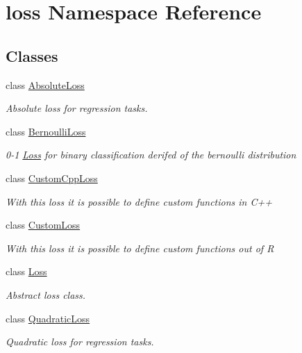 \hypertarget{namespaceloss}{}\section{loss Namespace Reference}
\label{namespaceloss}
\subsection*{Classes}
\begin{DoxyCompactItemize}
\item 
class \mbox{\hyperlink{classloss_1_1_absolute_loss}{Absolute\+Loss}}
\begin{DoxyCompactList}\small\item\em Absolute loss for regression tasks. \end{DoxyCompactList}\item 
class \mbox{\hyperlink{classloss_1_1_bernoulli_loss}{Bernoulli\+Loss}}
\begin{DoxyCompactList}\small\item\em 0-\/1 \mbox{\hyperlink{classloss_1_1_loss}{Loss}} for binary classification derifed of the bernoulli distribution \end{DoxyCompactList}\item 
class \mbox{\hyperlink{classloss_1_1_custom_cpp_loss}{Custom\+Cpp\+Loss}}
\begin{DoxyCompactList}\small\item\em With this loss it is possible to define custom functions in {\ttfamily C++} \end{DoxyCompactList}\item 
class \mbox{\hyperlink{classloss_1_1_custom_loss}{Custom\+Loss}}
\begin{DoxyCompactList}\small\item\em With this loss it is possible to define custom functions out of {\ttfamily R} \end{DoxyCompactList}\item 
class \mbox{\hyperlink{classloss_1_1_loss}{Loss}}
\begin{DoxyCompactList}\small\item\em Abstract loss class. \end{DoxyCompactList}\item 
class \mbox{\hyperlink{classloss_1_1_quadratic_loss}{Quadratic\+Loss}}
\begin{DoxyCompactList}\small\item\em Quadratic loss for regression tasks. \end{DoxyCompactList}\end{DoxyCompactItemize}
